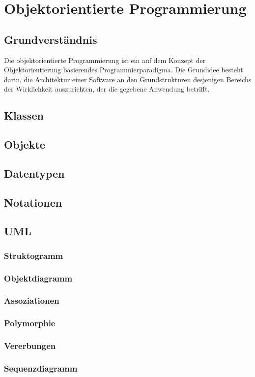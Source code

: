 \documentclass[12pt,a4paper]{article}
\begin{document}
\section{Objektorientierte Programmierung}
\subsection{Grundverständnis}
Die objektorientierte Programmierung ist ein auf dem Konzept der Objektorientierung basierendes Programmierparadigma. Die Grundidee besteht darin, die Architektur einer Software an den Grundstrukturen desjenigen Bereichs der Wirklichkeit auszurichten, der die gegebene Anwendung betrifft.
\subsection{Klassen}
\subsection{Objekte}
\subsection{Datentypen}
\subsection{Notationen}
\subsection{UML}
\subsubsection{Struktogramm}
\subsubsection{Objektdiagramm}
\subsubsection{Assoziationen}
\subsubsection{Polymorphie}
\subsubsection{Vererbungen}
\subsubsection{Sequenzdiagramm}
\end{document}
